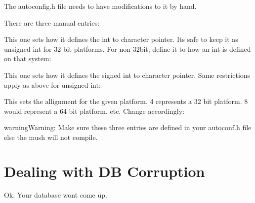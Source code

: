 \documentclass[letterpaper,10pt,english]{sphinxmanual}
\begin{document}
\sphinxAtStartPar
The autoconfig.h file needs to have modifications to it by hand.

\sphinxAtStartPar
There are three manual entries:

\sphinxAtStartPar
This one sets how it defines the int to character pointer.  It\textquotesingle{}s safe
to keep it as \textquotesingle{}unsigned int\textquotesingle{} for 32 bit platforms.  For non 32\sphinxhyphen{}bit,
define it to  how an int is defined on that system:

\begin{sphinxVerbatim}[commandchars=\\\{\}]
      
\end{sphinxVerbatim}

\sphinxAtStartPar
This one sets how it defines the signed int to character pointer.  Same
restrictions apply as above for unsigned int:

\begin{sphinxVerbatim}[commandchars=\\\{\}]
      
\end{sphinxVerbatim}

\sphinxAtStartPar
This sets the allignment for the given platform.  4 represents a 32 bit
platform.  8 would represent a 64 bit platform, etc.  Change accordingly:

\begin{sphinxVerbatim}[commandchars=\\\{\}]
\end{sphinxVerbatim}

\begin{sphinxadmonition}{warning}{Warning:}
\sphinxAtStartPar
Make sure these three entries are defined in your autoconf.h file else
the mush will not compile.
\end{sphinxadmonition}


\section{Dealing with DB Corruption}
\label{\detokenize{troubleshooting:dealing-with-db-corruption}}
\sphinxAtStartPar
Ok.  Your database won\textquotesingle{}t come up.
\end{document}
